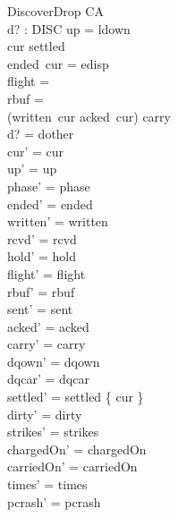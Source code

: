 \documentclass[a4paper,10pt,fleqn]{article}
\begin{document}
\begin{schema}{DiscoverDrop}
  \Delta CA \\
  d? : DISC
\where
  up = ldown \\
  cur \notin settled \\
  ended~cur = edisp \\
  flight = \emptyset \\
  rbuf = \emptyset \\
  (written~cur \setminus acked~cur) \cup carry \neq \emptyset \\
  d? = dother \\
  cur' = cur \\
  up' = up \\
  phase' = phase \\
  ended' = ended \\
  written' = written \\
  rcvd' = rcvd \\
  hold' = hold \\
  flight' = flight \\
  rbuf' = rbuf \\
  sent' = sent \\
  acked' = acked \\
  carry' = carry \\
  dqown' = dqown \\
  dqcar' = dqcar \\
  settled' = settled \cup \{ cur \} \\
  dirty' = dirty \\
  strikes' = strikes \\
  chargedOn' = chargedOn \\
  carriedOn' = carriedOn \\
  times' = times \\
  pcrash' = pcrash
\end{schema}
\end{document}
